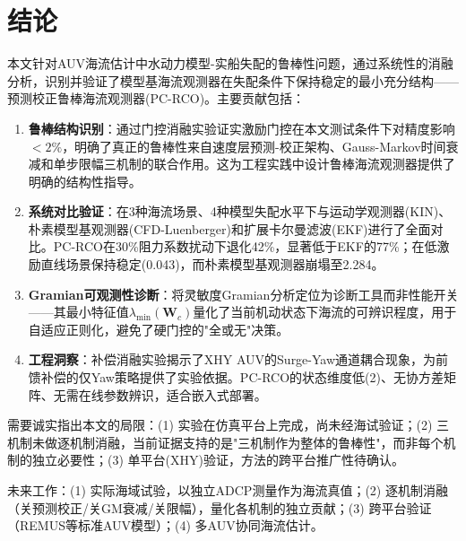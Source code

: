 \section{结论}

本文针对AUV海流估计中水动力模型-实船失配的鲁棒性问题，通过系统性的消融分析，识别并验证了模型基海流观测器在失配条件下保持稳定的最小充分结构——预测校正鲁棒海流观测器(PC-RCO)。主要贡献包括：

\begin{enumerate}
    \item \textbf{鲁棒结构识别}：通过门控消融实验证实激励门控在本文测试条件下对精度影响$<2\%$，明确了真正的鲁棒性来自速度层预测-校正架构、Gauss-Markov时间衰减和单步限幅三机制的联合作用。这为工程实践中设计鲁棒海流观测器提供了明确的结构性指导。
    \item \textbf{系统对比验证}：在3种海流场景、4种模型失配水平下与运动学观测器(KIN)、朴素模型基观测器(CFD-Luenberger)和扩展卡尔曼滤波(EKF)进行了全面对比。PC-RCO在30\%阻力系数扰动下退化42\%，显著低于EKF的77\%；在低激励直线场景保持稳定(0.043)，而朴素模型基观测器崩塌至2.284。
    \item \textbf{Gramian可观测性诊断}：将灵敏度Gramian分析定位为诊断工具而非性能开关——其最小特征值$\lambda_{\min}(\bm{W}_c)$量化了当前机动状态下海流的可辨识程度，用于自适应正则化，避免了硬门控的"全或无"决策。
    \item \textbf{工程洞察}：补偿消融实验揭示了XHY AUV的Surge-Yaw通道耦合现象，为前馈补偿的仅Yaw策略提供了实验依据。PC-RCO的状态维度低(2)、无协方差矩阵、无需在线参数辨识，适合嵌入式部署。
\end{enumerate}

需要诚实指出本文的局限：(1) 实验在仿真平台上完成，尚未经海试验证；(2) 三机制未做逐机制消融，当前证据支持的是"三机制作为整体的鲁棒性"，而非每个机制的独立必要性；(3) 单平台(XHY)验证，方法的跨平台推广性待确认。

未来工作：(1) 实际海域试验，以独立ADCP测量作为海流真值；(2) 逐机制消融（关预测校正/关GM衰减/关限幅），量化各机制的独立贡献；(3) 跨平台验证（REMUS等标准AUV模型）；(4) 多AUV协同海流估计。
